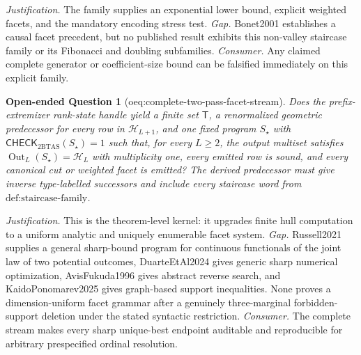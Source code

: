 \documentclass{article}
\newtheorem{openendedquestion}{Open-ended Question}
\begin{document}
\par\smallskip\noindent \textit{Justification.} The family supplies an exponential lower bound, explicit weighted facets, and the mandatory encoding stress test. \textit{Gap.} Bonet2001 establishes a causal facet precedent, but no published result exhibits this non-valley staircase family or its Fibonacci and doubling subfamilies. \textit{Consumer.} Any claimed complete generator or coefficient-size bound can be falsified immediately on this explicit family.

\begin{openendedquestion}[oeq:complete-two-pass-facet-stream]\label{oeq:complete-two-pass-facet-stream}
Does the prefix-extremizer rank-state handle yield a finite set \(\mathsf T\), a renormalized geometric predecessor for every row in \(\mathcal H_{L+1}\), and one fixed program \(S_\star\) with \(\mathsf{CHECK}_{2\mathrm{BTAS}}(S_\star)=1\) such that, for every \(L\ge2\), the output multiset satisfies \(\operatorname{Out}_L(S_\star)=\mathcal H_L\) with multiplicity one, every emitted row is sound, and every canonical cut or weighted facet is emitted? The derived predecessor must give inverse type-labelled successors and include every staircase word from \(\text{def:staircase-family}\).
\end{openendedquestion}
\par\smallskip\noindent \textit{Justification.} This is the theorem-level kernel: it upgrades finite hull computation to a uniform analytic and uniquely enumerable facet system. \textit{Gap.} Russell2021 supplies a general sharp-bound program for continuous functionals of the joint law of two potential outcomes, DuarteEtAl2024 gives generic sharp numerical optimization, AvisFukuda1996 gives abstract reverse search, and KaidoPonomarev2025 gives graph-based support inequalities. None proves a dimension-uniform facet grammar after a genuinely three-marginal forbidden-support deletion under the stated syntactic restriction. \textit{Consumer.} The complete stream makes every sharp unique-best endpoint auditable and reproducible for arbitrary prespecified ordinal resolution.
\end{document}
